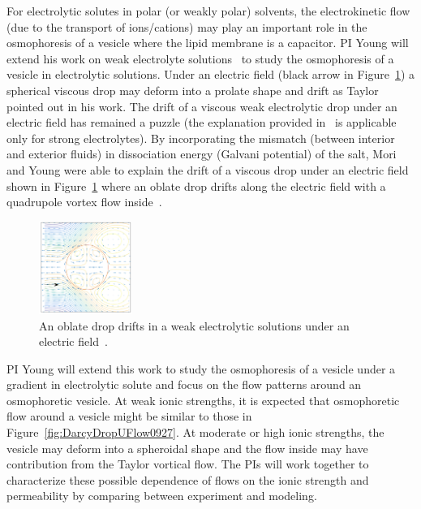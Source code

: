 \documentclass[11pt]{article}
\begin{document}
For electrolytic solutes in polar (or weakly polar) solvents, the
electrokinetic flow (due to the transport of ions/cations) may play an
important role in the osmophoresis of a vesicle where the lipid membrane
is a capacitor.  PI Young will extend his work on weak electrolyte
solutions~\cite{Mori2017_arXiv} to study the osmophoresis of a vesicle
in electrolytic solutions. Under an electric field (black arrow in
Figure~\ref{fig:Mori_fig7}) a spherical viscous drop may deform into a
prolate shape and drift as Taylor pointed out in his work. The drift of
a viscous weak electrolytic drop under an electric field has remained a
puzzle (the explanation provided in~\cite{Schnitzer2015_JFM} is
applicable only for strong electrolytes).  By incorporating the mismatch
(between interior and exterior fluids) in dissociation energy (Galvani
potential) of the salt, Mori and Young were able to explain the drift of
a viscous drop under an electric field shown in
Figure~\ref{fig:Mori_fig7} where an oblate drop drifts along the
electric field with a quadrupole vortex flow
inside~\cite{Mori2017_arXiv}.
\begin{figure}
\vspace*{-10pt}
\centerline{\includegraphics[width=1.2in]{figs/Mori2017_arXiv_fig7a.pdf}}
\vspace*{-12pt}
\caption{\label{fig:Mori_fig7} An oblate drop drifts in a weak
  electrolytic solutions under an electric field~\cite{Mori2017_arXiv}.}
\end{figure}
% 

PI Young will extend this work to study the osmophoresis of a vesicle
under a gradient in electrolytic solute and focus on the flow patterns
around an osmophoretic vesicle. At weak ionic strengths, it is expected
that osmophoretic flow around a vesicle might be similar to those in
Figure~\ref{fig:DarcyDropUFlow0927}.  At moderate or high ionic
strengths, the vesicle may deform into a spheroidal shape and the flow
inside may have contribution from the Taylor vortical flow. The PIs will
work together to characterize these possible dependence of flows on the
ionic strength and permeability by comparing between experiment and
modeling.
\end{document}
